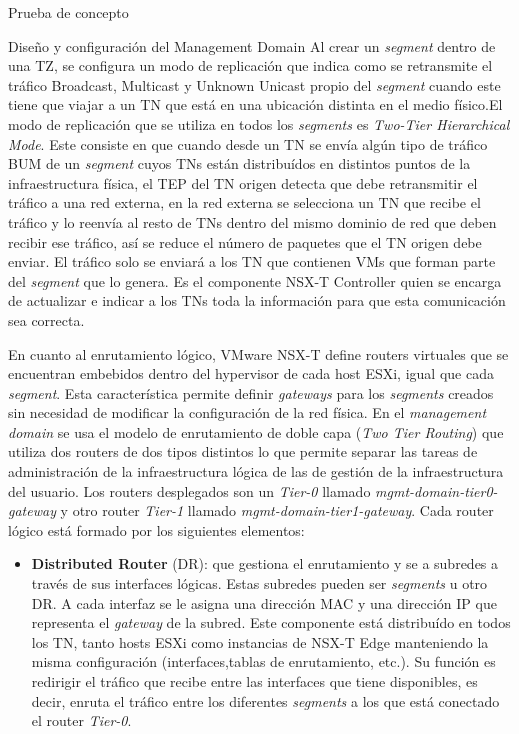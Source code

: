 \begin{section}{Prueba de concepto}
\begin{subsection}{Diseño y configuración del Management Domain}
    Al crear un \textit{segment} dentro de una TZ, se configura un modo de replicación que indica como se retransmite el tráfico Broadcast, Multicast y Unknown Unicast propio del \textit{segment} cuando este tiene que viajar a un TN que está en una ubicación distinta en el medio físico.El modo de replicación que se utiliza en todos los \textit{segments} es \textit{Two-Tier Hierarchical Mode}. Este consiste en que cuando desde un TN se envía algún tipo de tráfico BUM de un \textit{segment} cuyos TNs están distribuídos en distintos puntos de la infraestructura física, el TEP del TN origen detecta que debe retransmitir el tráfico a una red externa, en la red externa se selecciona un TN que recibe el tráfico y lo reenvía al resto de TNs dentro del mismo dominio de red que deben recibir ese tráfico, así se reduce el número de paquetes que el TN origen debe enviar. El tráfico solo se enviará a los TN que contienen VMs que forman parte del \textit{segment} que lo genera. Es el componente NSX-T Controller quien se encarga de actualizar e indicar a los TNs toda la información para que esta comunicación sea correcta.
    
    En cuanto al enrutamiento lógico, VMware NSX-T define routers virtuales que se encuentran embebidos dentro del hypervisor de cada host ESXi, igual que cada \textit{segment}. Esta característica permite definir \textit{gateways} para los \textit{segments} creados sin necesidad de modificar la configuración de la red física. En el \textit{management domain} se usa el modelo de enrutamiento de doble capa (\textit{Two Tier Routing}) que utiliza dos routers de dos tipos distintos lo que permite separar las tareas de administración de la infraestructura lógica de las de gestión de la infraestructura del usuario. Los routers desplegados son un \textit{Tier-0} llamado \textit{mgmt-domain-tier0-gateway} y otro router \textit{Tier-1} llamado \textit{mgmt-domain-tier1-gateway}. Cada router lógico está formado por los siguientes elementos:
    \begin{itemize}
      
      \item \textbf{Distributed Router} (DR): que gestiona el enrutamiento y se a subredes a través de sus interfaces lógicas. Estas subredes pueden ser \textit{segments} u otro DR. A cada interfaz se le asigna una dirección MAC y una dirección IP que representa el \textit{gateway} de la subred. Este componente está distribuído en todos los TN, tanto hosts ESXi como instancias de NSX-T Edge manteniendo la misma configuración (interfaces,tablas de enrutamiento, etc.). Su función es redirigir el tráfico que recibe entre las interfaces que tiene disponibles, es decir, enruta el tráfico entre los diferentes \textit{segments} a los que está conectado el router \textit{Tier-0}.  
      

\end{itemize}
\end{subsection}
\end{section}
